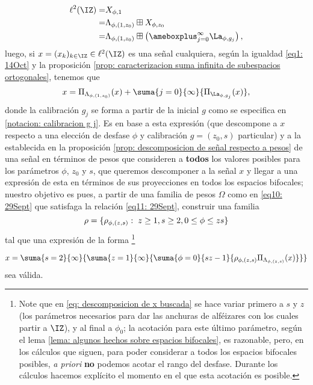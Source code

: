 \begin{align}
\ell^{2}(\IZ) = & X_{\phi, 1} \nonumber \\
= & 
\Lambda_{\phi, (1,z_{0})} \boxplus X_{\phi, z_{0}} \nonumber  \\
= & 
\Lambda_{\phi, (1,z_{0})} \boxplus \left( 
\ameboxplus_{j = 0}^{\infty} \La_{\phi, g_{j}} \right), 
\label{eq1: 14Oct} 
\end{align}
luego, si $x=(x_{k})_{k \in \IZ} \in \ell^{2}(\IZ)$
es una señal cualquiera, 
según la igualdad \eqref{eq1: 14Oct} y la 
proposición \ref{prop: caracterizacion suma infinita de subespacios ortogonales}, tenemos que
\begin{equation}
\label{eq: descomposicion de x dada una calibracion g}
x= \Pi_{\Lambda_{\phi, (1,z_{0})}}(x) + \suma{j=0}{\infty}{\Pi_{\La_{\phi,g_{j}}}(x) },
\end{equation}
donde la calibración $g_{j}$ se forma a partir
de la inicial $g$ como se especifica en 
\ref{notacion: calibracion g j}.
Es en base a esta expresión (que descompone a $x$ respecto 
a una elección de desfase $\phi$ y calibración $g=(z_{0},s)$
particular) y a la establecida en
la proposición 
\ref{prop: descomposicion de señal respecto a pesos}
de una señal en términos de pesos que consideren a \textbf{todos}
los valores posibles para los parámetros $\phi$, $z_{0}$
y $s$, que queremos descomponer a la señal $x$
y llegar a una expresión de esta 
en términos de
sus proyecciones en todos los
espacios bifocales; nuestro objetivo
es pues,
a partir de una familia de pesos
$\Omega$ como en
\eqref{eq10: 29Sept} que satisfaga
la relación \eqref{eq11: 29Sept},
construir una familia 
\[
\rho=\{ \rho_{\phi, (z,s)}: \hspace{0.1cm} z \geq 1, s \geq 2, 0 \leq
\phi \leq zs \}
\]
tal que una expresión de la forma
\footnote{Note que en \eqref{eq: descomposicion de x buscada}
se hace variar
primero a $s$ y $z$ (los parámetros necesarios para
dar las anchuras de alféizares
con los cuales partir 
a $\IZ$), y al final a $\phi_{0}$; la acotación
para este último parámetro, según el lema
\ref{lema: algunos hechos sobre espacios bifocales},
es razonable, pero, en los cálculos que siguen,
para poder considerar a todos los espacios 
bifocales posibles, 
\textit{a priori} \textbf{no} podemos acotar el rango del
desfase. Durante los cálculos hacemos explícito
el momento en el que esta
acotación es posible.}

\begin{equation}
\label{eq: descomposicion de x buscada}
x=\suma{s=2}{\infty}{
\suma{z=1}{\infty}{
\suma{\phi=0}{sz-1}{
\rho_{\phi, (z,s)} \Pi_{\Lambda_{\phi, (z,s)}}(x)
}
}
}
\end{equation}
sea válida.

